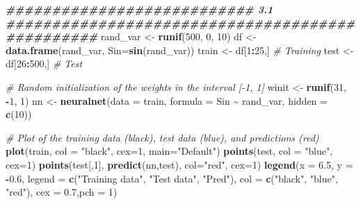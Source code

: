 \documentclass[
]{article}
\newenvironment{Shaded}{\begin{snugshade}}{\end{snugshade}}
\newcommand{\AttributeTok}[1]{\textcolor[rgb]{0.13,0.29,0.53}{#1}}
\newcommand{\CommentTok}[1]{\textcolor[rgb]{0.56,0.35,0.01}{\textit{#1}}}
\newcommand{\DecValTok}[1]{\textcolor[rgb]{0.00,0.00,0.81}{#1}}
\newcommand{\DocumentationTok}[1]{\textcolor[rgb]{0.56,0.35,0.01}{\textbf{\textit{#1}}}}
\newcommand{\FloatTok}[1]{\textcolor[rgb]{0.00,0.00,0.81}{#1}}
\newcommand{\FunctionTok}[1]{\textcolor[rgb]{0.13,0.29,0.53}{\textbf{#1}}}
\newcommand{\NormalTok}[1]{#1}
\newcommand{\OtherTok}[1]{\textcolor[rgb]{0.56,0.35,0.01}{#1}}
\newcommand{\SpecialCharTok}[1]{\textcolor[rgb]{0.81,0.36,0.00}{\textbf{#1}}}
\newcommand{\StringTok}[1]{\textcolor[rgb]{0.31,0.60,0.02}{#1}}
\begin{document}
\begin{Shaded}
\begin{Highlighting}[]
\DocumentationTok{\#\#\#\#\#\#\#\#\#\#\#\#\#\#\#\#\#\#\#\#\#\#\#\#\#\#\#  3.1 \#\#\#\#\#\#\#\#\#\#\#\#\#\#\#\#\#\#\#\#\#\#\#\#\#\#\#\#\#\#\#\#\#\#\#\#\#\#\#\#\#\#\#\#\#\#\#\#}
\NormalTok{rand\_var }\OtherTok{\textless{}{-}} \FunctionTok{runif}\NormalTok{(}\DecValTok{500}\NormalTok{, }\DecValTok{0}\NormalTok{, }\DecValTok{10}\NormalTok{)}
\NormalTok{df }\OtherTok{\textless{}{-}} \FunctionTok{data.frame}\NormalTok{(rand\_var, }\AttributeTok{Sin=}\FunctionTok{sin}\NormalTok{(rand\_var))}
\NormalTok{train }\OtherTok{\textless{}{-}}\NormalTok{ df[}\DecValTok{1}\SpecialCharTok{:}\DecValTok{25}\NormalTok{,] }\CommentTok{\# Training}
\NormalTok{test }\OtherTok{\textless{}{-}}\NormalTok{ df[}\DecValTok{26}\SpecialCharTok{:}\DecValTok{500}\NormalTok{,] }\CommentTok{\# Test}

\CommentTok{\# Random initialization of the weights in the interval [{-}1, 1]}
\NormalTok{winit }\OtherTok{\textless{}{-}} \FunctionTok{runif}\NormalTok{(}\DecValTok{31}\NormalTok{, }\SpecialCharTok{{-}}\DecValTok{1}\NormalTok{, }\DecValTok{1}\NormalTok{)}
\NormalTok{nn }\OtherTok{\textless{}{-}} \FunctionTok{neuralnet}\NormalTok{(}\AttributeTok{data =}\NormalTok{ train, }\AttributeTok{formula =}\NormalTok{ Sin }\SpecialCharTok{\textasciitilde{}}\NormalTok{ rand\_var, }\AttributeTok{hidden =} \FunctionTok{c}\NormalTok{(}\DecValTok{10}\NormalTok{))}

\CommentTok{\# Plot of the training data (black), test data (blue), and predictions (red)}
\FunctionTok{plot}\NormalTok{(train,  }\AttributeTok{col =} \StringTok{"black"}\NormalTok{, }\AttributeTok{cex=}\DecValTok{1}\NormalTok{, }\AttributeTok{main=}\StringTok{"Default"}\NormalTok{)}
\FunctionTok{points}\NormalTok{(test, }\AttributeTok{col =} \StringTok{"blue"}\NormalTok{, }\AttributeTok{cex=}\DecValTok{1}\NormalTok{)}
\FunctionTok{points}\NormalTok{(test[,}\DecValTok{1}\NormalTok{], }\FunctionTok{predict}\NormalTok{(nn,test), }\AttributeTok{col=}\StringTok{"red"}\NormalTok{, }\AttributeTok{cex=}\DecValTok{1}\NormalTok{)}
\FunctionTok{legend}\NormalTok{(}\AttributeTok{x =} \FloatTok{6.5}\NormalTok{, }\AttributeTok{y =} \SpecialCharTok{{-}}\FloatTok{0.6}\NormalTok{, }\AttributeTok{legend =} \FunctionTok{c}\NormalTok{(}\StringTok{"Training data"}\NormalTok{, }\StringTok{"Test data"}\NormalTok{,}
\StringTok{"Pred"}\NormalTok{), }\AttributeTok{col =} \FunctionTok{c}\NormalTok{(}\StringTok{"black"}\NormalTok{, }\StringTok{"blue"}\NormalTok{, }\StringTok{"red"}\NormalTok{), }\AttributeTok{cex =} \FloatTok{0.7}\NormalTok{,}\AttributeTok{pch =} \DecValTok{1}\NormalTok{)}
\end{Highlighting}
\end{Shaded}
\end{document}
